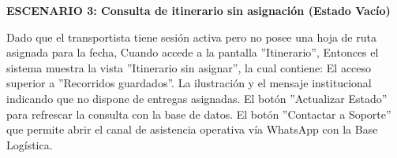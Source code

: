 \documentclass[a4paper,9pt]{article}
\begin{document}
\begin{tcolorbox}[hucard, title={\textbf{HU-62: CONSULTAR ITINERARIO} \hfill \scriptsize \colorbox{tealstatus}{\textbf{\ Accepted\ }} \quad \colorbox{white}{\textcolor{primarydark}{\textbf{\ 2 pts\ }}}}]
{\noindent\textbf{\textcolor{secondarydark}{ESCENARIO 3:  Consulta de itinerario sin asignación (Estado Vacío)}}\par\vspace{1pt}
Dado que el transportista tiene sesión activa pero no posee una hoja de ruta asignada para la fecha, Cuando accede a la pantalla ''Itinerario'', Entonces el sistema muestra la vista ''Itinerario sin asignar'', la cual contiene: El acceso superior a ''Recorridos guardados''. La ilustración y el mensaje institucional indicando que no dispone de entregas asignadas. El botón ''Actualizar Estado'' para refrescar la consulta con la base de datos. El botón ''Contactar a Soporte'' que permite abrir el canal de asistencia operativa vía WhatsApp con la Base Logística.\par\vspace{2.5pt}
}\par
\end{tcolorbox}
\end{document}
